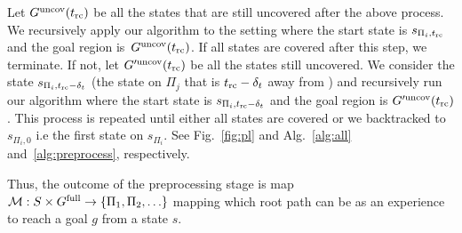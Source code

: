 \documentclass[a4paper,10pt]{article}
\begin{document}
Let $G^{\textrm{uncov}}(t_{\textrm{rc}})$ be all the states that are still uncovered after the above process. We recursively apply our algorithm to the setting where the start state is $s_{\Pi_i, t_{\textrm{rc}}}$ and the goal region is~$G^{\textrm{uncov}}(t_{\textrm{rc}})$.
If all states are covered after this step, we terminate. 
If not, let $G'^{\textrm{uncov}}(t_{\textrm{rc}})$ be all the states still uncovered.
We consider the state $s_{\Pi_i, t_{\textrm{rc}}-\delta_t}$ (the state on $\Pi_j$ that is $t_{\textrm{rc}}-\delta_t$ away from \Shome) and recursively run our algorithm where the start state is $s_{\Pi_i, t_{\textrm{rc}}-\delta_t}$ and the goal region is $G'^{\textrm{uncov}}(t_{\textrm{rc}})$.
This process is repeated until either all states are covered or we backtracked to $s_{\Pi_i, 0}$ i.e the first state on $s_{\Pi_i}$.
See Fig.~\ref{fig:pl} and  Alg.~\ref{alg:all} and~\ref{alg:preprocess}, respectively.

Thus, the outcome of the preprocessing stage is map $\mathcal{M}: S \times G^{\textrm{full}} \rightarrow \{ \Pi_1, \Pi_2, \ldots \}$ mapping which root path can be as an experience to reach a goal $g$ from a state $s$.
\end{document}
